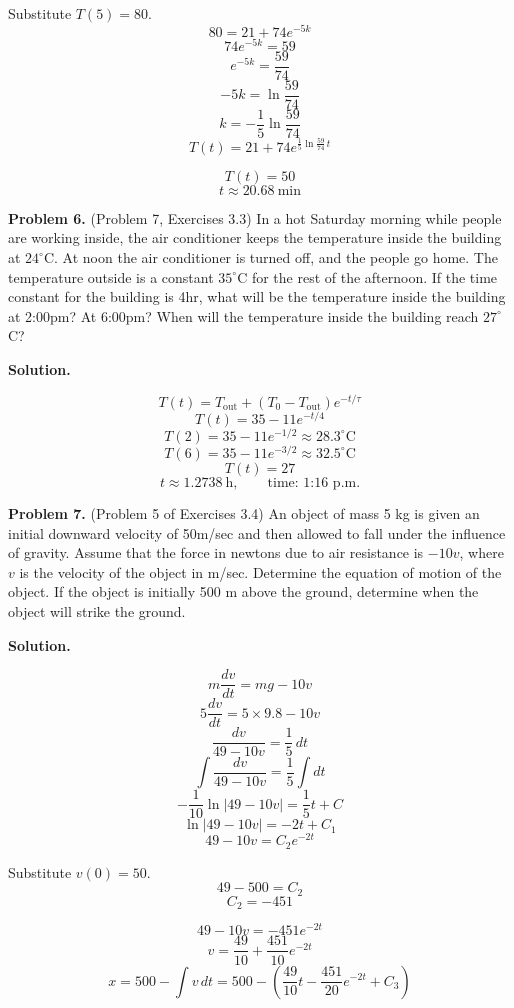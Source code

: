 \documentclass[11pt,a4paper]{article}
\begin{document}
Substitute \(T(5)=80\).
\[
80=21+74e^{-5k}
\]
\[
74e^{-5k}=59
\]
\[
e^{-5k}=\frac{59}{74}
\]
\[
-5k=\ln\frac{59}{74}
\]
\[
k=-\frac15\ln\frac{59}{74}
\]
\[
T(t)=21+74e^{\frac15\ln\frac{59}{74}\,t}
\]

\[
T(t)=50
\]
\[
t\approx20.68\ \mathrm{min}
\]

\bigskip

\bigskip
\noindent
{\bf Problem 6.} (Problem 7, Exercises 3.3) In a hot Saturday morning while people are working inside, the air conditioner
keeps the temperature inside the building at $24^{\circ}$C. At noon the air conditioner is turned off, and the people
go home. The temperature outside is a constant $35^{\circ}$C for the rest of the afternoon. If the time constant for the building is 4hr, what will
be the temperature inside the building at 2:00pm? At 6:00pm? When will the
temperature inside the building reach $27^{\circ}$C?
\par\medskip
\noindent\textbf{Solution.}\par
\medskip

\[
T(t)=T_{\mathrm{out}}
+(T_0-T_{\mathrm{out}})e^{-t/\tau}
\]
\[
T(t)=35-11e^{-t/4}
\]
\[
T(2)=35-11e^{-1/2}\approx28.3^\circ\mathrm C
\]
\[
T(6)=35-11e^{-3/2}\approx32.5^\circ\mathrm C
\]
\[
T(t)=27
\]
\[
t\approx1.2738\ \mathrm h,
\qquad \text{time: 1:16 p.m.}
\]

\bigskip

\bigskip
\noindent
{\bf Problem 7.} (Problem 5 of Exercises 3.4) An object  of mass 5 kg is given an initial downward velocity of 50m/sec and then allowed to fall
under the influence of gravity. Assume that the force in newtons due to air resistance is $-10v$, where $v$ is
the velocity of the object in m/sec. Determine the equation of motion of the object. If the object is initially
500 m above the ground, determine when the object will strike the ground.
\par\medskip
\noindent\textbf{Solution.}\par
\medskip

\[
m\frac{dv}{dt}=mg-10v
\]
\[
5\frac{dv}{dt}=5\times9.8-10v
\]
\[
\frac{dv}{49-10v}=\frac15\,dt
\]
\[
\int\frac{dv}{49-10v}=\frac15\int dt
\]
\[
-\frac1{10}\ln|49-10v|=\frac15t+C
\]
\[
\ln|49-10v|=-2t+C_1
\]
\[
49-10v=C_2e^{-2t}
\]

Substitute \(v(0)=50\).
\[
49-500=C_2
\]
\[
C_2=-451
\]

\[
49-10v=-451e^{-2t}
\]
\[
v=\frac{49}{10}+\frac{451}{10}e^{-2t}
\]
\[
x=500-\int v\,dt
=500-\left(
\frac{49}{10}t-\frac{451}{20}e^{-2t}+C_3
\right)
\]
\end{document}
